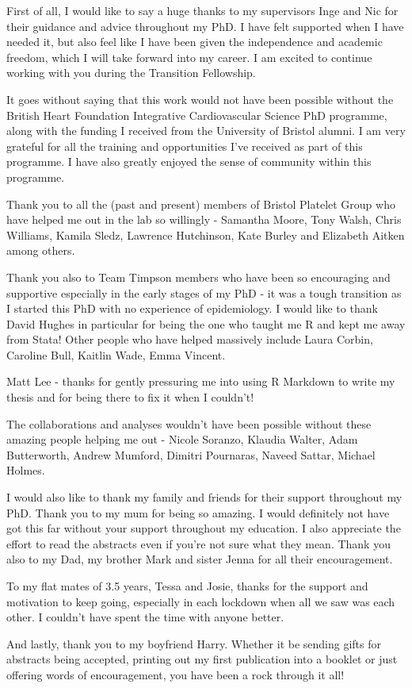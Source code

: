 \documentclass[11pt,twoside]{bristolthesis}
\begin{document}
  \begin{acknowledgements}
    First of all, I would like to say a huge thanks to my supervisors Inge and Nic for their guidance and advice throughout my PhD. I have felt supported when I have needed it, but also feel like I have been given the independence and academic freedom, which I will take forward into my career. I am excited to continue working with you during the Transition Fellowship.

    It goes without saying that this work would not have been possible without the British Heart Foundation Integrative Cardiovascular Science PhD programme, along with the funding I received from the University of Bristol alumni. I am very grateful for all the training and opportunities I've received as part of this programme. I have also greatly enjoyed the sense of community within this programme.

    Thank you to all the (past and present) members of Bristol Platelet Group who have helped me out in the lab so willingly - Samantha Moore, Tony Walsh, Chris Williams, Kamila Sledz, Lawrence Hutchinson, Kate Burley and Elizabeth Aitken among others.

    Thank you also to Team Timpson members who have been so encouraging and supportive especially in the early stages of my PhD - it was a tough transition as I started this PhD with no experience of epidemiology. I would like to thank David Hughes in particular for being the one who taught me R and kept me away from Stata! Other people who have helped massively include Laura Corbin, Caroline Bull, Kaitlin Wade, Emma Vincent.

    Matt Lee - thanks for gently pressuring me into using R Markdown to write my thesis and for being there to fix it when I couldn't!

    The collaborations and analyses wouldn't have been possible without these amazing people helping me out - Nicole Soranzo, Klaudia Walter, Adam Butterworth, Andrew Mumford, Dimitri Pournaras, Naveed Sattar, Michael Holmes.

    I would also like to thank my family and friends for their support throughout my PhD. Thank you to my mum for being so amazing. I would definitely not have got this far without your support throughout my education. I also appreciate the effort to read the abstracts even if you're not sure what they mean. Thank you also to my Dad, my brother Mark and sister Jenna for all their encouragement.

    To my flat mates of 3.5 years, Tessa and Josie, thanks for the support and motivation to keep going, especially in each lockdown when all we saw was each other. I couldn't have spent the time with anyone better.

    And lastly, thank you to my boyfriend Harry. Whether it be sending gifts for abstracts being accepted, printing out my first publication into a booklet or just offering words of encouragement, you have been a rock through it all!
  \end{acknowledgements}
\end{document}
